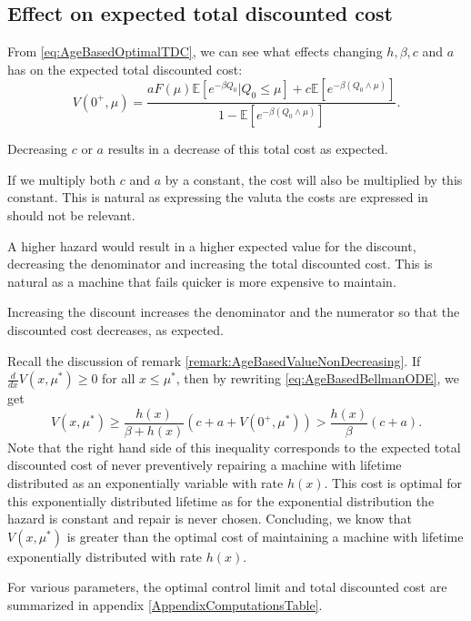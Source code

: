 \subsection{Effect on expected total discounted cost}
From \eqref{eq:AgeBasedOptimalTDC}, we can see what effects changing $h,\beta,c$ and $a$ has on the expected total discounted cost:
\[V(0^+,\mu)=\frac{aF(\mu)\mathbb{E}[e^{-\beta Q_0}|Q_0\leq \mu]+c\mathbb{E}[e^{-\beta(Q_0\wedge\mu)}]}{1-\mathbb{E}[e^{-\beta (Q_0\wedge\mu)}]}.\]
\begin{remark}
	Decreasing $c$ or $a$ results in a decrease of this total cost as expected.
\end{remark}
\begin{remark}\label{remark:AgeBasedCostRatio}
	If we multiply both $c$ and $a$ by a constant, the cost will also be multiplied by this constant.
	This is natural as expressing the valuta the costs are expressed in should not be relevant.
\end{remark}
\begin{remark}
	A higher hazard would result in a higher expected value for the discount, decreasing the denominator and increasing the total discounted cost.
	This is natural as a machine that fails quicker is more expensive to maintain.
\end{remark}
\begin{remark}\label{remark:AgeBasedTDCDiscountIncrease}
	Increasing the discount increases the denominator and the numerator so that the discounted cost decreases, as expected.
\end{remark}
\begin{remark}
	Recall the discussion of remark \ref{remark:AgeBasedValueNonDecreasing}.
	If $\frac{d}{dx}V(x,\mu^*)\geq0$ for all $x\leq\mu^*$, then by rewriting \eqref{eq:AgeBasedBellmanODE}, we get
	\[
	V(x,\mu^*)\geq \frac{h(x)}{\beta+h(x)}(c+a+V(0^+,\mu^*))>\frac{h(x)}{\beta}(c+a).
	\]
	Note that the right hand side of this inequality corresponds to the expected total discounted cost of never preventively repairing a machine with lifetime distributed as an exponentially variable with rate $h(x)$.
	This cost is optimal for this exponentially distributed lifetime as for the exponential distribution the hazard is constant and repair is never chosen.
	Concluding, we know that $V(x,\mu^*)$ is greater than the optimal cost of maintaining a machine with lifetime exponentially distributed with rate $h(x)$.
\end{remark}
For various parameters, the optimal control limit and total discounted cost are summarized in appendix \ref{AppendixComputationsTable}.